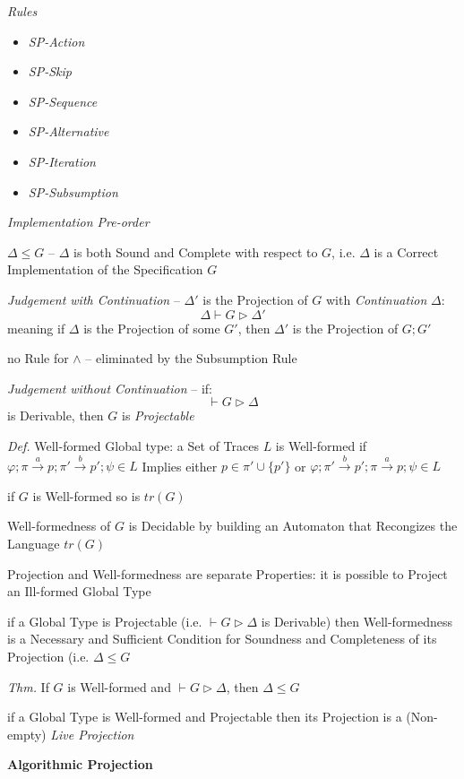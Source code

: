 \emph{Rules}
\begin{itemize}
  \item \emph{SP-Action}
  \item \emph{SP-Skip}
  \item \emph{SP-Sequence}
  \item \emph{SP-Alternative}
  \item \emph{SP-Iteration}
  \item \emph{SP-Subsumption}
\end{itemize}

\emph{Implementation Pre-order}

$\Delta \leq G$ -- $\Delta$ is both Sound and Complete with respect to
$G$, i.e. $\Delta$ is a Correct Implementation of the Specification
$G$

\emph{Judgement with Continuation} -- $\Delta'$ is the Projection of
$G$ with \emph{Continuation} $\Delta$:
\[
  \Delta \vdash G \rhd \Delta'
\]
meaning if $\Delta$ is the Projection of some $G'$, then $\Delta'$ is
the Projection of $G;G'$

no Rule for $\wedge$ -- eliminated by the Subsumption Rule

\emph{Judgement without Continuation} -- if:
\[
  \vdash G \rhd \Delta
\]
is Derivable, then $G$ is \emph{Projectable}

\emph{Def.} Well-formed Global type: a Set of Traces $L$ is
Well-formed if $\varphi; \pi \xrightarrow{a} p; \pi' \xrightarrow{b}
p'; \psi \in L$ Implies either $p \in \pi' \cup \{p'\}$ or $\varphi;
\pi' \xrightarrow{b} p'; \pi \xrightarrow{a} p; \psi \in L$

if $G$ is Well-formed so is $tr(G)$

Well-formedness of $G$ is Decidable by building an Automaton that
Recongizes the Language $tr(G)$

Projection and Well-formedness are separate Properties: it is possible
to Project an Ill-formed Global Type

if a Global Type is Projectable (i.e. $\vdash G \rhd \Delta$ is
Derivable) then Well-formedness is a Necessary and Sufficient
Condition for Soundness and Completeness of its Projection (i.e.
$\Delta \leq G$

\emph{Thm.} If $G$ is Well-formed and $\vdash G \rhd \Delta$, then
$\Delta \leq G$

if a Global Type is Well-formed and Projectable then its Projection is
a (Non-empty) \emph{Live Projection}


\textbf{Algorithmic Projection}

